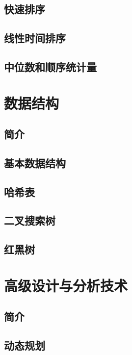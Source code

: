 \documentclass[lang=cn,newtx,10pt,scheme=chinese]{elegantbook}
\begin{document}
\chapter{快速排序}

\chapter{线性时间排序}

\chapter{中位数和顺序统计量}

\part{数据结构}

\chapter*{简介}

\chapter{基本数据结构}

\chapter{哈希表}

\chapter{二叉搜索树}

\chapter{红黑树}

\part{高级设计与分析技术}

\chapter*{简介}

\chapter{动态规划}
\end{document}
